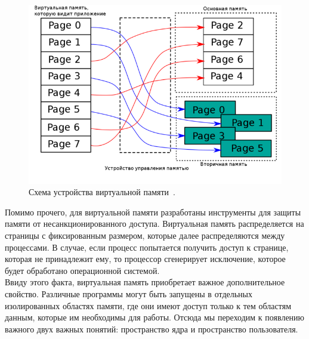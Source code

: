 \begin{figure}[H]
    \centering
    \includegraphics[scale=0.5,width=\textwidth]{inc/img/virt_mem}
    \caption{Схема устройства виртуальной памяти~\cite{virt-mem-pic}.}
    \label{fig:virt_mem}
\end{figure}


Помимо прочего, для виртуальной памяти разработаны инструменты для защиты памяти от несанкционированного доступа.
Виртуальная память распределяется на страницы с фиксированным размером, которые далее распределяются между процессами.
В случае, если процесс попытается получить доступ к странице, которая не принадлежит ему, то процессор сгенерирует исключение, которое будет обработано операционной системой.
\\
\indent Ввиду этого факта, виртуальная память приобретает важное дополнительное свойство.
Различные программы могут быть запущены в отдельных изолированных областях памяти, где они имеют доступ только к тем областям данным,
которые им необходимы для работы.
Отсюда мы переходим к появлению важного двух важных понятий: пространство ядра и пространство пользователя.
\newpage
